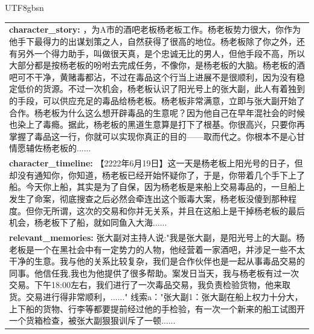 \documentclass[11pt]{article}
\begin{document}
{\begin{CJK}{UTF8}{gbsn}
\begin{table}[ht!]
\begin{tabular}{|m{16cm}|}
  \textbf{  character\_story:} ，为A市的酒吧老板杨老板工作。杨老板势力很大，你作为他手下最得力的出谋划策之人，自然获得了很高的地位。杨老板除了你之外，还有另外一个得力助手，叫做很天真，是个忠诚无比的男人，但他手段不高，所以大部分都是按杨老板的吩咐去完成任务，不像你，是杨老板的大脑。杨老板的酒吧可不干净，黄赌毒都沾，不过在毒品这个行当上进展不是很顺利，因为没有稳定低价的货源。不过一次机会，杨老板认识了阳光号上的张大副，此人有着独到的手段，可以供应充足的毒品给杨老板。杨老板非常满意，立即与张大副开始了合作。杨老板为什么这么想开辟毒品的生意呢？因为他自己在早年混社会的时候也染上了毒瘾。据此，杨老板的黑道生意算是打下了根基。你很高兴，只要你再掌握了毒品这一行，你就可以实现你真正的目的——取而代之。你根本不是心甘情愿辅佐杨老板的......\\
\textbf{  character\_timeline:} \small【2222年6月19日】这一天是杨老板上阳光号的日子，但却没有通知你，你知道，杨老板已经开始怀疑你了，于是，你带着几个手下上了船。今天你上船，其实是为了自保，因为杨老板是来船上交易毒品的，一旦船上发生了命案，彻底搜查之后必然会牵连出这个贩毒大案，杨老板没傻到那种程度。但你无所谓，这次的交易和你并无关系，并且在这船上是干掉杨老板的最后机会，杨老板下了船，就如同鱼入大海......\\
\textbf{  relevant\_memories:} \small 张大副对主持人说:"我是张大副，是阳光号上的大副。杨老板是一个在黑社会中有一定势力的人物，他经营着一家酒吧，并涉足一些不太干净的生意。我与他的关系比较复杂，我们是合作伙伴也是一起从事毒品交易的同事。他信任我,我也为他提供了很多帮助。案发日当天，我与杨老板有过一次交易。下午18:00左右，我们进行了一次毒品交易，我负责检验货物，他来取货。交易进行得非常顺利，......" 线索a："张大副1：张大副在船上权力十分大，上下船的货物、行李等都要提前经过他的手检验，有一次一个新来的船工试图开一个货箱检查，被张大副狠狠训斥了一顿...... \\


\end{tabular}
\end{table}
\end{CJK}}
\end{document}
